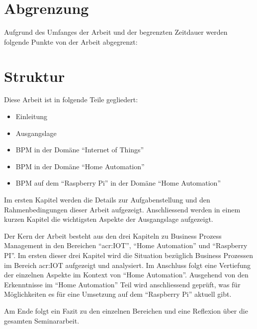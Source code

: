 \section{Abgrenzung} \label{sec:Abgrenzung}
Aufgrund des Umfanges der Arbeit und der begrenzten Zeitdauer werden folgende Punkte von der Arbeit abgegrenzt:

\begin{itemize}
\end{itemize}


\section{Struktur}
Diese Arbeit ist in folgende Teile gegliedert:

\begin{itemize}
\item Einleitung
\item Ausgangslage
\item BPM in der Domäne "`Internet of Things"'
\item BPM in der Domäne "`Home Automation"'
\item BPM auf dem "`Raspberry Pi"' in der Domäne "`Home Automation"'
\end{itemize}

Im ersten Kapitel werden die Details zur Aufgabenstellung und den Rahmenbedingungen dieser Arbeit aufgezeigt. Anschliessend werden in einem kurzen Kapitel die wichtigsten Aspekte der Ausgangslage aufgezeigt.

Der Kern der Arbeit besteht aus den drei Kapiteln zu Business Prozess Management in den Bereichen "`\gls{acr:IOT}"', "`Home Automation"' und "`Raspberry PI"'. Im ersten dieser drei Kapitel wird die Situation bezüglich Business Prozessen im Bereich \gls{acr:IOT} aufgezeigt und analysiert. Im Anschluss folgt eine Vertiefung der einzelnen Aspekte im Kontext von "`Home Automation"'. Ausgehend von den Erkenntnisse im "`Home Automation"' Teil wird anschliessend geprüft, was für Möglichkeiten es für eine Umsetzung auf dem "`Raspberry Pi"' aktuell gibt.

Am Ende folgt ein Fazit zu den einzelnen Bereichen und eine Reflexion über die gesamten Seminararbeit.
